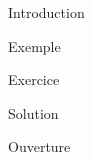 
\begin{slide}{Introduction}

\end{slide}


\begin{slide}{Exemple}

\end{slide}


\begin{slide}{Exercice}

\end{slide}


\begin{slide}{Solution}

\end{slide}


\begin{slide}{Ouverture}

\end{slide}